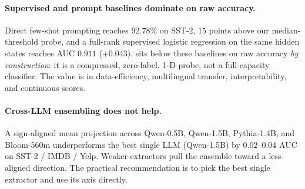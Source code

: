 \paragraph{Supervised and prompt baselines dominate on raw accuracy.}
Direct few-shot prompting reaches $92.78\%$ on SST-2, $15$ points above
our median-threshold probe, and a full-rank supervised logistic
regression on the same hidden states reaches AUC $0.911$ ($+0.043$).
\ours{} sits below these baselines on raw accuracy \emph{by
construction}: it is a compressed, zero-label, 1-D probe, not a
full-capacity classifier. The value is in data-efficiency, multilingual
transfer, interpretability, and continuous scores.

\paragraph{Cross-LLM ensembling does not help.}
A sign-aligned mean projection across Qwen-0.5B, Qwen-1.5B, Pythia-1.4B,
and Bloom-560m underperforms the best single LLM (Qwen-1.5B) by
$0.02$--$0.04$ AUC on SST-2 / IMDB / Yelp. Weaker extractors pull the
ensemble toward a less-aligned direction. The practical recommendation
is to pick the best single extractor and use its axis directly.
